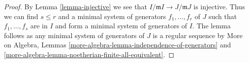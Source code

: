 \documentclass{stacks-project}
\theoremstyle{plain}
\theoremstyle{definition}
\theoremstyle{remark}
\numberwithin{equation}{subsection}
\begin{document}
\begin{proof}
By Lemma \ref{lemma-injective} we see that
$I/\mathfrak m I \to J/\mathfrak m J$
is injective. Thus we can find $s \leq r$ and a minimal system of
generators $f_1, \ldots, f_r$ of $J$ such that $f_1, \ldots, f_s$ are in $I$
and form a minimal system of generators of $I$.
The lemma follows as any minimal system of generators of $J$
is a regular sequence by
More on Algebra, Lemmas
\ref{more-algebra-lemma-independence-of-generators} and
\ref{more-algebra-lemma-noetherian-finite-all-equivalent}.
\end{proof}
\end{document}
